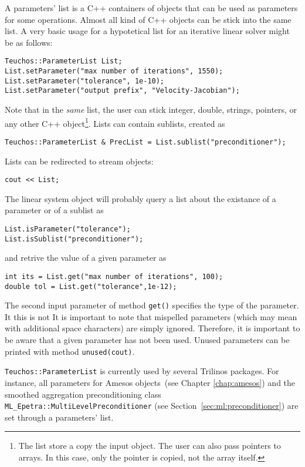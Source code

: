 A parameters' list is a C++ containers of objects that can be used as
parameters for some operations. Almost all kind of C++ objects can be
stick into the same list. A very basic usage for a hypotetical list for
an iterative linear solver might be as follows:
\begin{verbatim}
Teuchos::ParameterList List;
List.setParameter("max number of iterations", 1550);
List.setParameter("tolerance", 1e-10);
List.setParameter("output prefix", "Velocity-Jacobian");
\end{verbatim}
Note that in the {\sl same} list, the user can stick integer, double,
strings, pointers, or any other C++ object\footnote{The list store a
  copy the input object. The user can also pass pointers to arrays. In
  this case, only the pointer is copied, not the array itself.}.  Lists
can contain sublists, created as
\begin{verbatim}
Teuchos::ParameterList & PrecList = List.sublist("preconditioner");
\end{verbatim}
Lists can be redirected to stream objects:
\begin{verbatim}
cout << List;
\end{verbatim}
The linear system object will probably query a list about the existance
of a parameter or of a sublist as
\begin{verbatim}
List.isParameter("tolerance");
List.isSublist("preconditioner");
\end{verbatim}
and retrive the value of a given parameter as
\begin{verbatim}
int its = List.get("max number of iterations", 100);
double tol = List.get("tolerance",1e-12);
\end{verbatim}
The second input parameter of method \verb!get()! specifies the type of
the parameter. It this is not 
It is important to note that mispelled parameters (which may mean with
additional space characters) are simply ignored. Therefore, it is
important to be aware that a given parameter has not been used. Unused
parameters can be printed with method \verb!unused(cout)!.

\begin{remark}
  \verb!Teuchos::ParameterList! is currently used by several Trilinos
  packages. For instance, all parameters for Amesos objects~(see Chapter
  \ref{chap:amesos}) and the smoothed aggregation preconditioning class
  \verb!ML_Epetra::MultiLevelPreconditioner! (see
  Section~\ref{sec:ml:preconditioner}) are set through a parameters'
  list.
\end{remark}


